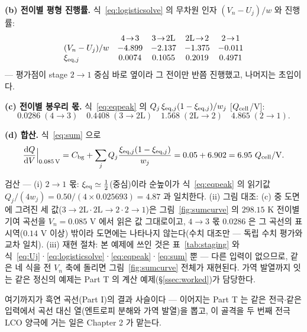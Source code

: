 \textbf{(b) 전이별 평형 진행률.} 식~\eqref{eq:logisticsolve} 의 무차원 인자 $(V_n-U_j)/w$ 와 진행률:
\[
\begin{array}{lcccc}
 & 4\!\to\!3 & 3\!\to\!2\mathrm L & 2\mathrm L\!\to\!2 & 2\!\to\!1\\
(V_n-U_j)/w & -4.899 & -2.137 & -1.375 & -0.011\\
\xi_{\eq,j} & 0.0074 & 0.1055 & 0.2019 & 0.4971
\end{array}
\]
--- 평가점이 stage $2\!\to\!1$ 중심 바로 옆이라 그 전이만 반쯤 진행했고, 나머지는 초입이다.

\textbf{(c) 전이별 봉우리 몫.} 식~\eqref{eq:eqpeak} 의 $Q_j\,\xi_{\mathrm{eq},j}(1-\xi_{\mathrm{eq},j})/w_j$ [$Q_{\mathrm{cell}}$/V]:
\[
0.0286\;(4\!\to\!3)\quad 0.4408\;(3\!\to\!2\mathrm L)\quad 1.568\;(2\mathrm L\!\to\!2)\quad 4.865\;(2\!\to\!1).
\]

\textbf{(d) 합산.} 식~\eqref{eq:sum} 으로
\[
\frac{\mathrm{d} Q}{\mathrm{d} V}\Big|_{0.085\,\mathrm V}=C_{\mathrm{bg}}+\sum_j Q_j\frac{\xi_{\mathrm{eq},j}(1-\xi_{\mathrm{eq},j})}{w_j}
=0.05+6.902=6.95\ Q_{\mathrm{cell}}/\mathrm{V}.
\]
\begin{verifybox}
검산 --- (i) $2\!\to\!1$ 몫: $\xi_{\mathrm{eq}}\simeq\tfrac12$(중심)이라 순높이가 식~\eqref{eq:eqpeak} 의 읽기값
$Q_j/(4w_j)=0.50/(4\times0.025693)=4.87$ 과 일치한다. (ii) 그림 대조: (c) 중 도면에 그려진 세 값($3\!\to\!2\mathrm L\cdot2\mathrm L\!\to\!2\cdot2\!\to\!1$)은
그림~\ref{fig:sumcurve} 의 $298.15$ K 전이별 기여 곡선을 $V_n=0.085$ V 에서 읽은 값 그대로이고, $4\!\to\!3$ 몫 $0.0286$ 은 그 곡선의 표시역($0.14$ V 이상) 밖이라 도면에는 나타나지 않는다(수치 대조만 --- 독립
수치 평가와 교차 일치). (iii) 재현 절차: 본 예제에 쓰인 것은 표~\ref{tab:staging} 와
식~\eqref{eq:Uj}·\eqref{eq:logisticsolve}·\eqref{eq:eqpeak}·\eqref{eq:sum} 뿐 --- 다른 입력이 없으므로,
같은 네 식을 전 $V_n$ 축에 돌리면 그림~\ref{fig:sumcurve} 전체가 재현된다. 가역 발열까지 잇는 같은
정신의 예제는 Part T 의 계산 예제(\S\ref{ssec:worked})가 담당한다.
\end{verifybox}


여기까지가 흑연 곡선(Part I)의 결과 사슬이다 --- 이어지는 Part T 는 같은 전극$\cdot$같은 입력에서 곡선
대신 열(엔트로피 분해와 가역 발열)을 뽑고, 이 골격을 두 번째 전극 LCO 양극에 거는 일은 Chapter 2 가 맡는다.

